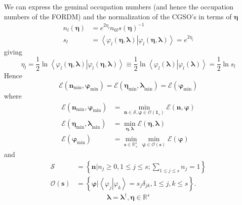 \documentclass[aps,preprint]{revtex4}%
\begin{document}
We can express the geminal occupation numbers (and hence the occupation
numbers of the FORDM) and the normalization of the CGSO's in terms of
$\mathbf{\eta}$
\begin{align}
n_{l}\left(  \mathbf{\eta}\right)   &  =e^{2\eta_{l}}n_{0l}\mathit{s}\left(
\mathbf{\eta}\right)  ^{-1}\nonumber\\
s_{l}  &  =\left\langle \left.  \varphi_{l}\left(  \mathbf{\eta,\lambda
}\right)  \right\vert \varphi_{l}\left(  \mathbf{\eta,\lambda}\right)
\right\rangle =e^{2\eta_{l}}%
\end{align}
giving
\begin{equation}
\eta_{l}=\frac{1}{2}\ln\left\langle \left.  \varphi_{l}\left(  \mathbf{\eta
,\lambda}\right)  \right\vert \varphi_{l}\left(  \mathbf{\eta,\lambda}\right)
\right\rangle \equiv\frac{1}{2}\ln\left\langle \left.  \varphi_{l}\left(
\mathbf{\lambda}\right)  \right\vert \varphi_{l}\left(  \mathbf{\lambda
}\right)  \right\rangle =\frac{1}{2}\ln s_{l}%
\end{equation}
Hence%
\begin{equation}
\mathcal{E}\left(  \mathbf{n}_{\min}\mathbf{,\varphi}_{\min}\right)
=\mathcal{E}\left(  \mathbf{\eta}_{\min}\mathbf{,\lambda}_{\min}\right)
=\mathcal{E}\left(  \mathbf{\varphi}_{\min}\right)
\end{equation}
where
\begin{align}
\mathcal{E}\left(  \mathbf{n}_{\min}\mathbf{,\varphi}_{\min}\right)   &
=\min_{\mathbf{n\in\mathcal{S},\varphi\in}\mathcal{O}\left(  \mathbf{1}%
_{s}\right)  }\mathcal{E}\left(  \mathbf{n,\varphi}\right) \\
\mathcal{E}\left(  \mathbf{\eta}_{\min}\mathbf{,\lambda}_{\min}\right)   &
=\min_{\mathbf{\eta,\lambda}}\mathcal{E}\left(  \mathbf{\eta,\lambda}\right)
\\
\mathcal{E}\left(  \mathbf{\varphi}_{\min}\right)   &  =\min_{\mathbf{s\in
}\mathbb{R}_{+}^{s}}\min_{\mathbf{\varphi\in}\mathcal{O}\left(  \mathbf{s}%
\right)  }\mathcal{E}\left(  \mathbf{\varphi}\right)
\end{align}
and
\begin{align}
\mathcal{S}  &  =\left\{  \left.  \mathbf{n}\right\vert n_{j}\geq0,1\leq j\leq
s;\sum_{1\leq j\leq s}n_{j}=1\right\} \\
\mathcal{O}\left(  \mathbf{s}\right)   &  =\left\{  \left.  \mathbf{\varphi
}\right\vert \left\langle \left.  \varphi_{j}\right\vert \varphi
_{k}\right\rangle =s_{j}\delta_{jk},1\leq j,k\leq s\right\}  .
\end{align}%
\begin{equation}
\mathbf{\lambda}=\mathbf{\lambda}^{\dagger},\mathbf{\eta\in}\mathbb{R}^{s}%
\end{equation}%
\end{document}
